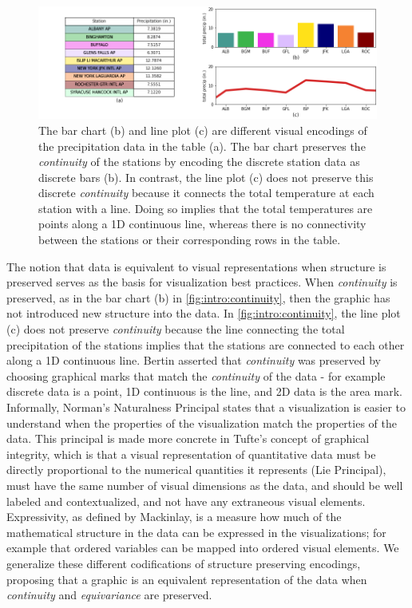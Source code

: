 \documentclass[../main.tex]{subfiles}
\begin{document}
\begin{figure}[H]
    \includegraphics[width=1\textwidth]{figures/intro/continuity.png}
    \caption{The bar chart (b) and line plot (c) are different visual encodings of the precipitation data in the table (a). The bar chart preserves the \textit{continuity} of the stations by encoding the discrete station data as discrete bars (b). In contrast, the line plot (c) does not preserve this discrete \textit{continuity} because it connects the total temperature at each station with a line. Doing so implies that the total temperatures are points along a 1D continuous line, whereas there is no connectivity between the stations or their corresponding rows in the table.}
    \label{fig:intro:continuity}
\end{figure}
The notion that data is equivalent to visual representations when structure is preserved serves as the basis for visualization best practices. When \textit{continuity} is preserved, as in the bar chart (b) in \autoref{fig:intro:continuity}, then the graphic has not introduced new structure into the data.  In \autoref{fig:intro:continuity}, the line plot (c) does not preserve \textit{continuity} because the line connecting the total precipitation of the stations implies that the stations are connected to each other along a 1D continuous line. Bertin asserted that \textit{continuity} was preserved by choosing graphical marks that match the \textit{continuity} of the data - for example discrete data is a point, 1D continuous is the line, and 2D data is the area mark. Informally, Norman's Naturalness Principal\cite{NaturalnessPrincipleInfoVis,norman_things_smart} states that a visualization is easier to understand when the properties of the visualization match the properties of the data. This principal is made more concrete in Tufte's concept of graphical integrity, which is that a visual representation of quantitative data must be directly proportional to the numerical quantities it represents (Lie Principal), must have the same number of visual dimensions as the data, and should be well labeled and contextualized, and not have any extraneous visual elements\cite{tufteVisualDisplayQuantitative2001}. Expressivity, as defined by Mackinlay, is a measure how much of the mathematical structure in the data can be expressed in the visualizations; for example that ordered variables can be mapped into ordered visual elements. We generalize these different codifications of structure preserving encodings, proposing that a graphic is an equivalent representation of the data when \textit{continuity} and \textit{equivariance} are preserved.
\end{document}

